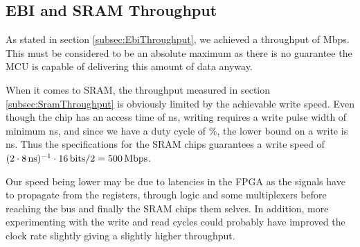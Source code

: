 \subsection{EBI and SRAM Throughput}
As stated in section \ref{subsec:EbiThroughput}, we achieved a throughput of \unit[384]{Mbps}.
This must be considered to be an absolute maximum as there is no guarantee the MCU is capable of delivering this amount of data anyway.

When it comes to SRAM, the throughput measured in section \ref{subsec:SramThroughput} is obviously limited by the achievable write speed.
Even though the chip has an access time of \unit[10]{ns}, writing requires a write pulse width of minimum \unit[8]{ns}, and since we have a duty cycle of \unit[50]{\%}, the lower bound on a write is \unit[16]{ns}.
Thus the specifications for the SRAM chips guarantees a write speed of $(2\cdot\unit[8]{ns})^{-1} \cdot \unit[16]{bits} / 2 = \unit[500]{Mbps}$.

Our speed being lower may be due to latencies in the FPGA as the signals have to propagate from the registers, through logic and some multiplexers before reaching the bus and finally the SRAM chips them selves. In addition, more experimenting with the write and read cycles could probably have improved the clock rate slightly giving a slightly higher throughput.
